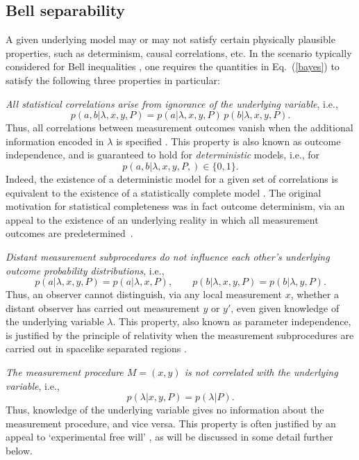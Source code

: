 \documentclass[graybox]{svmult}
\begin{document}
\subsection{Bell separability}
\label{2.2}

A given underlying model may or may not satisfy certain physically plausible properties, such as determinism, causal correlations, etc.  In the scenario typically considered for Bell inequalities \cite{bell}, one requires the quantities in Eq.~(\ref{bayes}) to satisfy the following three properties in particular:

 {\it All statistical correlations arise from ignorance of the underlying variable}, i.e., 
\begin{equation} \label{comp}
p(a,b|\lambda,x,y,P) = p(a|\lambda,x,y,P)\,p(b|\lambda,x,y,P) .
\end{equation}
Thus, all correlations between measurement outcomes vanish when the additional information encoded in $\lambda$ is specified \cite{jarrett}.  This property is also known as outcome independence, and is guaranteed to hold for {\it deterministic} models, i.e., for
\[p(a,b|\lambda,x,y,P,)\in\{0,1\}. \]
 Indeed, the existence of a deterministic model for a given set of correlations is equivalent to the existence of a statistically complete model \cite{relaxed,fine}. The original motivation for statistical completeness  was in fact outcome determinism, via an appeal to the existence of an underlying reality in which all measurement outcomes are predetermined~\cite{bell}.

 {\it Distant measurement subprocedures do not influence each other's underlying outcome probability distributions}, i.e.,
\begin{equation} \label{local}
p(a|\lambda,x,y,P) = p(a|\lambda,x,P),\qquad p(b|\lambda,x,y,P) = p(b|\lambda,y,P) .
\end{equation}
Thus, an observer cannot distinguish, via any local measurement $x$, whether a distant observer has carried out measurement $y$ or $y'$, even given knowledge of the underlying variable $\lambda$.  This property, also known as parameter independence, is justified by the principle of relativity when the measurement subprocedures are carried out in spacelike separated regions \cite{bell}.  

 {\it The measurement procedure $M=(x,y)$ is not correlated with the underlying variable}, i.e., 
\begin{equation} \label{mi}
p(\lambda|x,y,P) = p(\lambda|P).
\end{equation}
Thus, knowledge of the underlying variable gives no information about the measurement procedure, and vice versa.  This property is often justified by an appeal to `experimental free will' \cite{dialectica}, as will be discussed in some detail further below. 
\goodbreak
\end{document}

